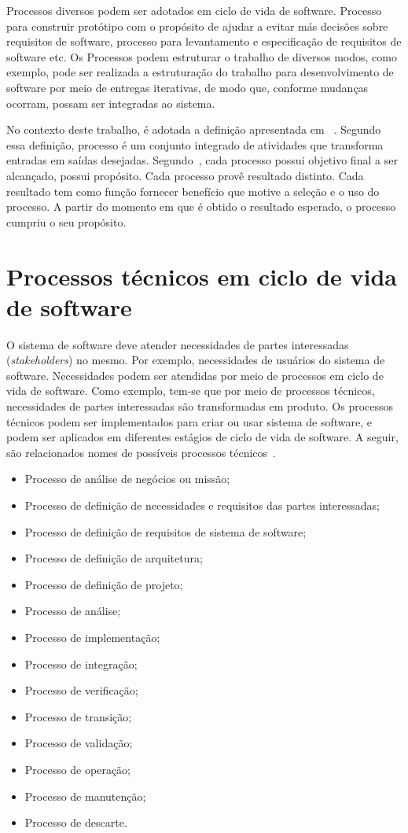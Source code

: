 Processos diversos podem ser adotados em ciclo de vida de software. Processo para construir protótipo com o propósito de ajudar a evitar más decisões sobre requisitos de software, processo para levantamento e especificação de requisitos de software etc. Os Processos podem estruturar o trabalho de diversos modos, como exemplo, pode ser realizada a estruturação do trabalho para desenvolvimento de software por meio de entregas iterativas, de modo que, conforme mudanças ocorram, possam ser integradas ao sistema.

No contexto deste trabalho, é adotada a definição apresentada em ~\cite{ISO_247483}. Segundo essa definição, processo é um conjunto integrado de atividades que transforma entradas em saídas desejadas. Segundo~\cite{ISO_247483}, cada processo possui objetivo final a ser alcançado, possui propósito. Cada processo provê resultado distinto. Cada resultado tem como função fornecer benefício que motive a seleção e o uso do processo. A partir do momento em que é obtido o resultado esperado, o processo cumpriu o seu propósito.

\section{Processos técnicos em ciclo de vida de software}

O sistema de software deve atender necessidades de partes interessadas (\emph{stakeholders}) no mesmo. Por exemplo, necessidades de usuários do sistema de software. Necessidades podem ser atendidas por meio de processos em ciclo de vida de software. Como exemplo, tem-se que por meio de processos técnicos, necessidades de partes interessadas são transformadas em produto. Os processos técnicos podem ser implementados para criar ou usar sistema de software, e podem ser aplicados em diferentes estágios de ciclo de vida de software. A seguir, são relacionados nomes de possíveis processos técnicos~\cite{ISO_12207}.

\begin{itemize}
    \item Processo de análise de negócios ou missão;
    \item Processo de definição de necessidades e requisitos das partes interessadas;
    \item Processo de definição de requisitos de sistema de software;
    \item Processo de definição de arquitetura;
    \item Processo de definição de projeto;
    \item Processo de análise;
    \item Processo de implementação;
    \item Processo de integração;
    \item Processo de verificação;
    \item Processo de transição;
    \item Processo de validação;
    \item Processo de operação;
    \item Processo de manutenção;
    \item Processo de descarte. 
\end{itemize}
      
